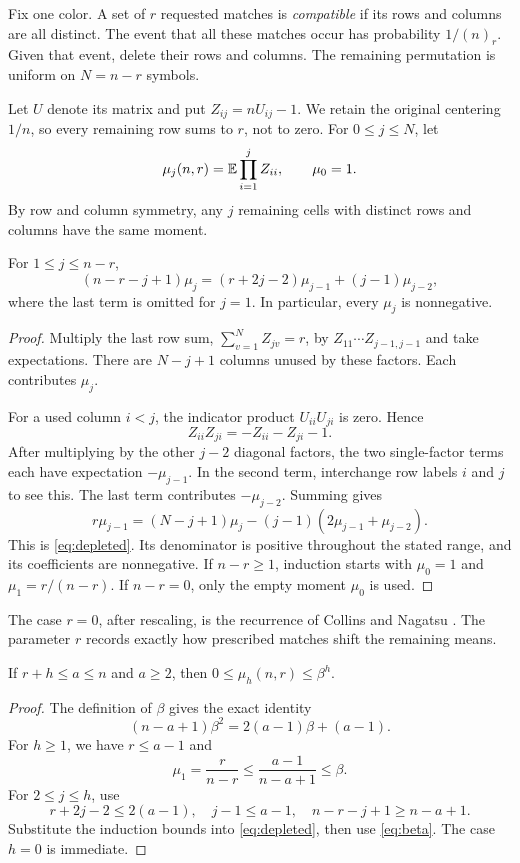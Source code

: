 Fix one color. A set of $r$ requested matches is \emph{compatible} if its rows and columns are all distinct. The event that all these matches occur has probability $1/(n)_r$. Given that event, delete their rows and columns. The remaining permutation is uniform on $N=n-r$ symbols.

Let $U$ denote its matrix and put $Z_{ij}=nU_{ij}-1$. We retain the original centering $1/n$, so every remaining row sums to $r$, not to zero. For $0\le j\le N$, let
\[
\mu_j(n,r)=\mathbb E\prod_{i=1}^j Z_{ii},\qquad \mu_0=1.
\]
By row and column symmetry, any $j$ remaining cells with distinct rows and columns have the same moment.

\begin{lemma}\label{lem:depleted}
For $1\le j\le n-r$,
\begin{equation}\label{eq:depleted}
(n-r-j+1)\mu_j=(r+2j-2)\mu_{j-1}+(j-1)\mu_{j-2},
\end{equation}
where the last term is omitted for $j=1$. In particular, every $\mu_j$ is nonnegative.
\end{lemma}
\begin{proof}
Multiply the last row sum, $\sum_{v=1}^{N}Z_{jv}=r$, by $Z_{11}\cdots Z_{j-1,j-1}$ and take expectations. There are $N-j+1$ columns unused by these factors. Each contributes $\mu_j$.

For a used column $i<j$, the indicator product $U_{ii}U_{ji}$ is zero. Hence
\[
Z_{ii}Z_{ji}=-Z_{ii}-Z_{ji}-1.
\]
After multiplying by the other $j-2$ diagonal factors, the two single-factor terms each have expectation $-\mu_{j-1}$. In the second term, interchange row labels $i$ and $j$ to see this. The last term contributes $-\mu_{j-2}$. Summing gives
\[
r\mu_{j-1}=(N-j+1)\mu_j-(j-1)(2\mu_{j-1}+\mu_{j-2}).
\]
This is \eqref{eq:depleted}. Its denominator is positive throughout the stated range, and its coefficients are nonnegative. If $n-r\ge1$, induction starts with $\mu_0=1$ and $\mu_1=r/(n-r)$. If $n-r=0$, only the empty moment $\mu_0$ is used.
\end{proof}

The case $r=0$, after rescaling, is the recurrence of Collins and Nagatsu \cite[Proposition 3.3, equation (16)]{CN}. The parameter $r$ records exactly how prescribed matches shift the remaining means.

\begin{lemma}\label{lem:super}
If $r+h\le a\le n$ and $a\ge2$, then $0\le\mu_h(n,r)\le\beta^h$.
\end{lemma}
\begin{proof}
The definition of $\beta$ gives the exact identity
\begin{equation}\label{eq:beta}
(n-a+1)\beta^2=2(a-1)\beta+(a-1).
\end{equation}
For $h\ge1$, we have $r\le a-1$ and
\[
\mu_1=\frac r{n-r}\le\frac{a-1}{n-a+1}\le\beta.
\]
For $2\le j\le h$, use
\[
r+2j-2\le2(a-1),\quad j-1\le a-1,\quad n-r-j+1\ge n-a+1.
\]
Substitute the induction bounds into \eqref{eq:depleted}, then use \eqref{eq:beta}. The case $h=0$ is immediate.
\end{proof}

